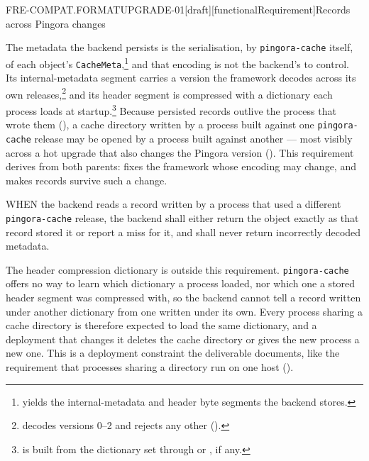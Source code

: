 \begin{requirement}{FRE-COMPAT.FORMATUPGRADE-01}[draft][functionalRequirement]{Records across Pingora changes}


  The metadata the backend persists is the serialisation, by
  \texttt{pingora-cache} itself, of each object's
  \texttt{CacheMeta},\footnote{
  yields the internal-metadata and header byte segments the backend stores.}
  and that encoding is not the backend's to control. Its internal-metadata
  segment carries a version the framework decodes across its own
  releases,\footnote{
  decodes versions 0--2 and rejects any other
  ().} and its header segment is
  compressed with a dictionary each process loads at
  startup.\footnote{
  is built from the dictionary set through
  or ,
  if any.} Because persisted records outlive the process that wrote them
  (), a cache directory written by a
  process built against one \texttt{pingora-cache} release may be opened by a
  process built against another --- most visibly across a hot upgrade that
  also changes the Pingora version (). This requirement derives from both
  parents:  fixes the framework whose encoding
  may change, and  makes records survive
  such a change.

  WHEN the backend reads a record written by a process that used a different
  \texttt{pingora-cache} release, the backend shall either return the object
  exactly as that record stored it or report a miss for it, and shall never
  return incorrectly decoded metadata.

  The header compression dictionary is outside this requirement.
  \texttt{pingora-cache} offers no way to learn which dictionary a process
  loaded, nor which one a stored header segment was compressed with, so the
  backend cannot tell a record written under another dictionary from one
  written under its own. Every process sharing a cache directory is
  therefore expected to load the same dictionary, and a deployment that
  changes it deletes the cache directory or gives the new process a new one.
  This is a deployment constraint the deliverable documents, like the
  requirement that processes sharing a directory run on one host
  ().


\end{requirement}
